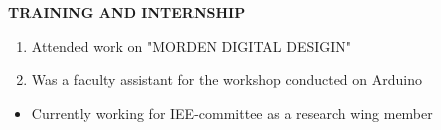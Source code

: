 \documentclass[a4paper]{article}
\begin{document}
\begin{flushleft}
\textbf {TRAINING AND INTERNSHIP}\\
\begin{enumerate}
\item Attended work on "MORDEN DIGITAL DESIGIN" 
\item Was a faculty assistant for the workshop conducted on Arduino
\end{enumerate}
\end{flushleft}


\begin{flushleft}
\textbf {}
\begin{itemize}
\item Currently working for IEE-committee as a research wing member
\end{itemize}
\end{flushleft}
\end{document}
